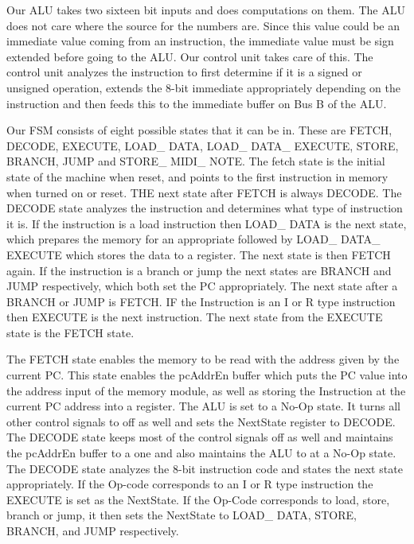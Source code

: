 \documentclass[onecolumn, 12pt]{IEEEtran}
\begin{document}
\par
	Our ALU takes two sixteen bit inputs and does computations on them. The ALU does not care where the source for the numbers are. Since this value could be an immediate value coming from an instruction, the immediate value must be sign extended before going to the ALU. Our control unit takes care of this. The control unit analyzes the instruction to first determine if it is a signed or unsigned operation, extends the 8-bit immediate appropriately depending on the instruction and then feeds this to the immediate buffer on Bus B of the ALU.
\par
Our FSM consists of eight possible states that it can be in. These are FETCH, DECODE, EXECUTE, LOAD\_ DATA, LOAD\_ DATA\_ EXECUTE, STORE, BRANCH, JUMP and STORE\_ MIDI\_ NOTE. The fetch state is the initial state of the machine when reset, and points to the first instruction in memory when turned on or reset. THE next state after FETCH is always DECODE. The DECODE state analyzes the instruction and determines what type of instruction it is. If the instruction is a load instruction then LOAD\_ DATA is the next state, which prepares the memory for an appropriate followed by LOAD\_ DATA\_ EXECUTE which stores the data to a register. The next state is then FETCH again. If the instruction is a branch or jump the next states are BRANCH and JUMP respectively, which both set the PC appropriately. The next state after a BRANCH or JUMP is FETCH. IF the Instruction is an I or R type instruction then EXECUTE is the next instruction. The next state from the EXECUTE state is the FETCH state. 
\par
The FETCH state enables the memory to be read with the address given by the current PC. This state enables the pcAddrEn buffer which puts the PC value into the address input of the memory module, as well as storing the Instruction at the current PC address into a register. The ALU is set to a No-Op state. It turns all other control signals to off as well and sets the NextState register to DECODE.
The DECODE state keeps most of the control signals off as well and maintains the pcAddrEn buffer to a one and also maintains the ALU to at a No-Op state. The DECODE state analyzes the 8-bit instruction code and states the next state appropriately. If the Op-code corresponds to an I or R type instruction the EXECUTE is set as the NextState. If the Op-Code corresponds to load, store, branch or jump, it then sets the NextState to LOAD\_ DATA, STORE, BRANCH, and JUMP respectively.
\par
\end{document}
